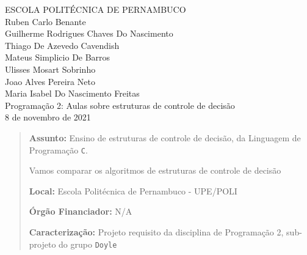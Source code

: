 \documentclass[a4paper,12pt]{article}  %
\begin{document}

\begin{center}
    \vspace{-30mm}
    \LARGE{ESCOLA POLITÉCNICA DE PERNAMBUCO}
    \vspace{10mm}
    \\ \large{Ruben Carlo Benante \\ Guilherme Rodrigues Chaves Do Nascimento \\ Thiago De Azevedo Cavendish \\ Mateus Simplicio De Barros 
    \\ Ulisses Mosart Sobrinho \\ Joao Alves Pereira Neto \\ Maria Isabel Do Nascimento Freitas}
    \vspace{40mm}
    \\ \LARGE{Programação 2:
    Aulas sobre estruturas de controle de decisão}
    \vspace{60mm}
    \\ \large{8 de novembro de 2021}
\end{center}


\newpage

\begin{abstract}

\textbf{Assunto:} Ensino de estruturas de controle de decisão, da Linguagem de Programação \texttt{C}.

 Vamos comparar os algoritmos de estruturas de controle de decisão %

\textbf{Local:} Escola Politécnica de Pernambuco - UPE/POLI

\textbf{Órgão Financiador:} N/A

\textbf{Caracterização:} Projeto requisito da disciplina de Programação 2, sub-projeto do grupo \texttt{Doyle}

\end{abstract}


\newpage

\tableofcontents


\end{document}
